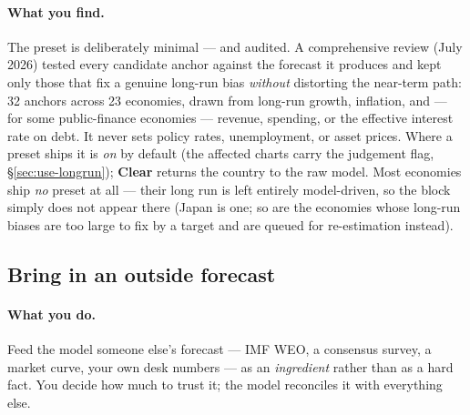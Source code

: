 \documentclass[11pt]{article}
\theoremstyle{definition}
\theoremstyle{remark}
\begin{document}
\paragraph{What you find.} The preset is deliberately minimal --- and audited. A
comprehensive review (July 2026) tested every candidate anchor against the forecast it
produces and kept only those that fix a genuine long-run bias \emph{without} distorting
the near-term path: 32 anchors across 23 economies, drawn from long-run growth,
inflation, and --- for some public-finance economies --- revenue, spending, or the
effective interest rate on debt. It never sets policy rates, unemployment, or asset
prices. Where a preset ships it is \emph{on} by default (the affected charts carry the
judgement flag, \S\ref{sec:use-longrun}); \textbf{Clear} returns the country to the raw
model. Most economies ship \emph{no} preset at all --- their long run is left entirely
model-driven, so the block simply does not appear there (Japan is one; so are the
economies whose long-run biases are too large to fix by a target and are queued for
re-estimation instead).

\subsection{Bring in an outside forecast}\label{sec:use-external}

\paragraph{What you do.} Feed the model someone else's forecast --- IMF WEO, a consensus
survey, a market curve, your own desk numbers --- as an \emph{ingredient} rather than as a
hard fact. You decide how much to trust it; the model reconciles it with everything else.
\end{document}
